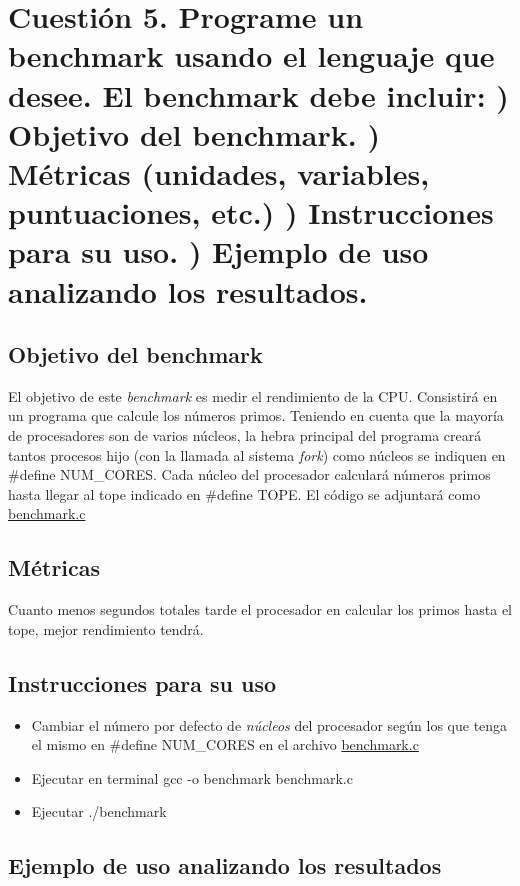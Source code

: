 \section{Cuestión 5. Programe un benchmark usando el lenguaje que desee. El benchmark debe incluir: ) Objetivo del benchmark. ) Métricas (unidades, variables, puntuaciones, etc.) ) Instrucciones para su uso. ) Ejemplo de uso analizando los resultados.}

\subsection{Objetivo del benchmark}

El objetivo de este \textit{benchmark} es medir el rendimiento de la CPU. Consistirá en un programa que calcule los números primos. Teniendo en cuenta que la mayoría de procesadores son de varios núcleos, la hebra principal del programa creará tantos procesos hijo (con la llamada al sistema \textit{fork}) como núcleos se indiquen en \#define NUM\_CORES.
Cada núcleo del procesador calculará números primos hasta llegar al tope indicado en \#define TOPE.
El código se adjuntará como \url{benchmark.c}

\subsection{Métricas}

Cuanto menos segundos totales tarde el procesador en calcular los primos hasta el tope, mejor rendimiento tendrá.

\subsection{Instrucciones para su uso}

\begin{itemize}
\item{Cambiar el número por defecto de \textit{núcleos} del procesador según los que tenga el mismo en \#define NUM\_CORES en el archivo \url{benchmark.c}}
\item{Ejecutar en terminal gcc -o benchmark benchmark.c}
\item{Ejecutar ./benchmark}
\end{itemize}

\subsection{Ejemplo de uso analizando los resultados}

